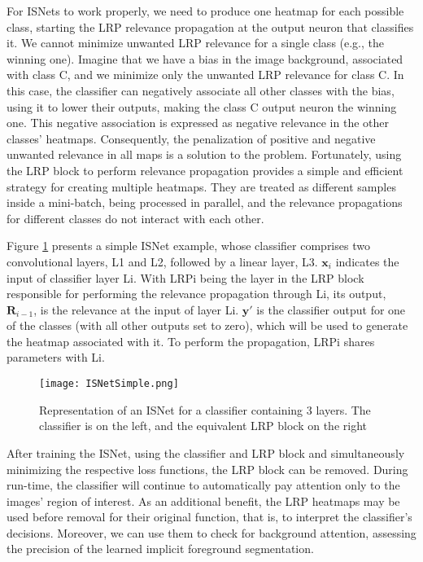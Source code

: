 \documentclass[fleqn,10pt]{wlscirep}
\begin{document}
{For ISNets to work properly, we need to produce one heatmap for each possible class, starting the LRP relevance propagation at the output neuron that classifies it. We cannot minimize unwanted LRP relevance for a single class (e.g., the winning one). Imagine that we have a bias in the image background, associated with class C, and we minimize only the unwanted LRP relevance for class C. In this case, the classifier can negatively associate all other classes with the bias, using it to lower their outputs, making the class C output neuron the winning one. This negative association is expressed as negative relevance in the other classes' heatmaps. Consequently, the penalization of positive and negative unwanted relevance in all maps is a solution to the problem. Fortunately, using the LRP block to perform relevance propagation provides a simple and efficient strategy for creating multiple heatmaps. They are treated as different samples inside a mini-batch, being processed in parallel, and the relevance propagations for different classes do not interact with each other. 

Figure \ref{SimpleISNet} presents a simple ISNet example, whose classifier comprises two convolutional layers, L1 and L2, followed by a linear layer, L3. $\bm{x}_{i}$ indicates the input of classifier layer Li. With LRPi being the layer in the LRP block responsible for performing the relevance propagation through Li, its output, $\bm{R}_{i-1}$, is the relevance at the input of layer Li. $\bm{y'}$ is the classifier output for one of the classes (with all other outputs set to zero), which will be used to generate the heatmap associated with it. To perform the propagation, LRPi shares parameters with Li.

\begin{figure}[h]
    \texttt{[image: ISNetSimple.png]}
    \centering
    \caption{Representation of an ISNet for a classifier containing 3 layers. The classifier is on the left, and the equivalent LRP block on the right}
    \label{SimpleISNet}
\end{figure}

After training the ISNet, using the classifier and LRP block and simultaneously minimizing the respective loss functions, the LRP block can be removed. During run-time, the classifier will continue to automatically pay attention only to the images' region of interest. As an additional benefit, the LRP heatmaps may be used before removal for their original function, that is, to interpret the classifier's decisions. Moreover, we can use them to check for background attention, assessing the precision of the learned implicit foreground segmentation. 

}
\end{document}
